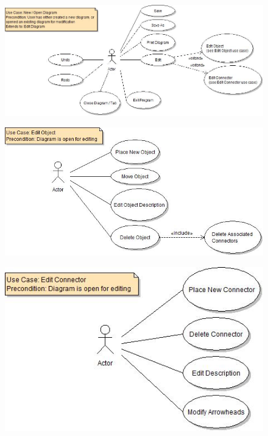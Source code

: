 \documentclass[twoside,letterpaper]{article}
\begin{document}
\begin{figure}[h]
\centering
\includegraphics[width=6.0in]{ucaseNewOpenDiagram.jpg}
\end{figure}

\begin{figure}[h]
\centering
\includegraphics[width=6.0in]{ucaseEditObj.jpg}
\end{figure}

\begin{figure}[h]
\centering
\includegraphics[width=6.0in]{ucaseEditConn.jpg}
\end{figure}
\end{document}
